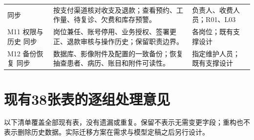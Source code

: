 \documentclass[UTF8,a4paper,zihao=-4,fontset=none]{ctexart}
\begin{document}
{\begin{longtable}{@{}p{2.6cm}p{8.1cm}p{4.8cm}@{}}
同步 & \raggedright\arraybackslash 按支付渠道核对收支及退款；查看预约、工作量、待复诊、欠费和库存预警。 & \raggedright\arraybackslash 负责人、收费人员；R01、L03 \\[4pt]
\raggedright\arraybackslash M11 权限与历史
同步 & \raggedright\arraybackslash 岗位兼任、账号停用、业务授权、签署更正、退款审核与操作历史；保留职责边界。 & \raggedright\arraybackslash 各岗位；既有支撑设计 \\[4pt]
\raggedright\arraybackslash M12 备份恢复
同步 & \raggedright\arraybackslash 数据库、影像附件及配置的一致备份；恢复抽查患者、病历、账目和附件可读性。 & \raggedright\arraybackslash 指定维护人员；既有支撑设计 \\[4pt]
\bottomrule
\end{longtable}
}
\clearpage\section{现有38张表的逐组处理意见}
以下清单覆盖全部现有表，没有遗漏或重复。保留不表示无需变更字段；重构也不表示删除历史数据。实际迁移方案在需求与模型定稿之后另行设计。
\end{document}
